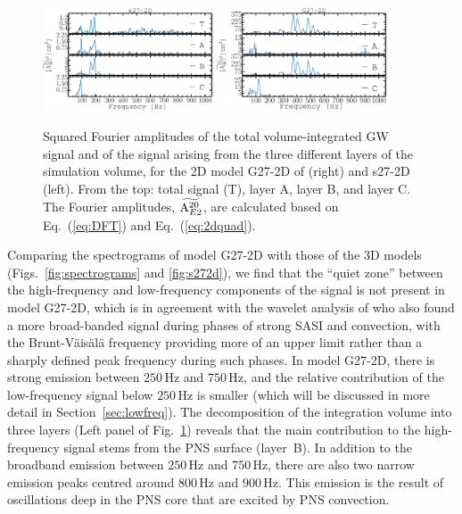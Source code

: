 \begin{figure}
\includegraphics[width=0.45\textwidth]{./images/chp1/fig9a.pdf}
\includegraphics[width=0.45\textwidth]{./images/chp1/fig9b.pdf}
\caption{Squared Fourier amplitudes of the total volume-integrated GW signal
  and of the signal arising from the three different layers of the simulation volume,
  for the 2D model G27-2D of \citet{mueller_13} (right) and s27-2D (left). 
  From the top: total signal (T), layer A, layer B, and layer C. 
  The Fourier amplitudes, $\widetilde{\mathrm{A}_{\mathrm\mathrm{E2}}^{\mathrm{20}}}$, are calculated based on Eq.~(\ref{eq:DFT}) and Eq.~(\ref{eq:2dquad}).
\label{fig:2dcut}}
\end{figure}
Comparing the spectrograms of model G27-2D with those of the 3D models (Figs.~\ref{fig:spectrograms} and
\ref{fig:s272d}), we find that the ``quiet zone'' between the
high-frequency and low-frequency components of the signal is not present in model G27-2D,
which is in agreement with the wavelet analysis of \citet{mueller_13}
who also found a more broad-banded signal during phases of strong SASI
and convection, with the Brunt-V\"{a}is\"{a}l\"{a} frequency providing
more of an upper limit rather than a sharply defined peak frequency
during such phases. In model G27-2D, there is strong emission between
$250 \, \mathrm{Hz}$ and $750 \, \mathrm{Hz}$, and the relative contribution of the
low-frequency signal below $250 \, \mathrm{Hz}$ is smaller (which will
be discussed in more detail in Section~\ref{sec:lowfreq}).
The decomposition of the integration volume into three layers
(Left panel of Fig.~\ref{fig:2dcut}) reveals that the main contribution to the
high-frequency signal stems from the PNS surface (layer~B).  
In addition to the broadband emission between $250 \, \mathrm{Hz}$ and $750 \, \mathrm{Hz}$,
there are also two narrow emission peaks centred around $800 \, \mathrm{Hz}$ and $900 \, \mathrm{Hz}$.
This emission is the result of oscillations deep in the PNS core that are excited by PNS convection.

